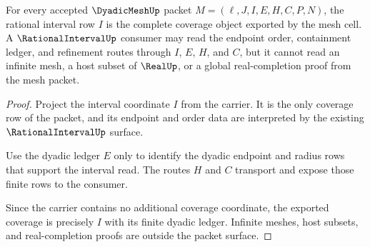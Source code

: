 \begin{theorem}
\label{thm:dyadicmesh-rationalinterval-coverage}
For every accepted $\DyadicMeshUp$ packet $M=(\ell,J,I,E,H,C,P,N)$, the rational interval row $I$ is the complete coverage object exported by the mesh cell. A $\RationalIntervalUp$ consumer may read the endpoint order, containment ledger, and refinement routes through $I$, $E$, $H$, and $C$, but it cannot read an infinite mesh, a host subset of $\RealUp$, or a global real-completion proof from the mesh packet.
\end{theorem}
\begin{proof}
Project the interval coordinate $I$ from the carrier. It is the only coverage row of the packet, and its endpoint and order data are interpreted by the existing $\RationalIntervalUp$ surface.

Use the dyadic ledger $E$ only to identify the dyadic endpoint and radius rows that support the interval read. The routes $H$ and $C$ transport and expose those finite rows to the consumer.

Since the carrier contains no additional coverage coordinate, the exported coverage is precisely $I$ with its finite dyadic ledger. Infinite meshes, host subsets, and real-completion proofs are outside the packet surface.
\end{proof}

